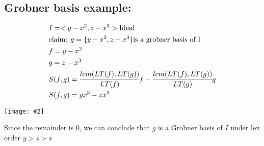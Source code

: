 \documentclass[11pt]{article}
\newcommand{\image}[2]{\texttt{[image: \#2]}}
\newcommand{\myalign}[1]{\begin{align*}#1\end{align*}}
\begin{document}
\subsection{Grobner basis example:}
\myalign{
    & I = <y-x^2,z-x^3> \text{Ideal}\\
    & \text{claim: }g = \{y-x^2,z-x^3\} \text{is a grobner basis of I} \\
    & f = y-x^2 \\
    & g = z-x^3 \\
    & S(f,g) = \cfrac{lcm(LT(f),LT(g))}{LT(f)}f - \cfrac{lcm(LT(f),LT(g))}{LT(g)}g \\
    & S(f,g) = yx^3-zx^3
}
\begin{center}
    \image{0.25}{img7}
\end{center}
Since the remainder is 0, we can conclude that $g$ is a Gröbner basis of $I$ under lex order $y > z > x$\\

\end{document}
